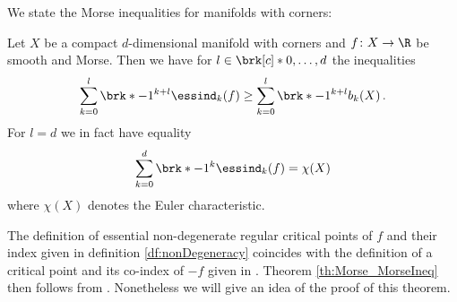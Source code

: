 We state the Morse inequalities for manifolds with corners:
\begin{theorem}
  \label{th:Morse_MorseIneq}
  Let $X$ be a compact $d$-dimensional manifold with corners and $f\colon X\to\R$ be smooth and Morse.
  Then we have for $l\in\brk[c]*{0,\dots,d}$ the inequalities
  \begin{align}
    \sum_{k=0}^l \brk*{-1}^{k+l}\essind_k(f)\geq \sum_{k=0}^l\brk*{-1}^{k+l}b_k(X)\,.
    \label{eq:MorseIneq_inequality}
  \end{align}
  For $l=d$ we in fact have equality
  \begin{align}
    \sum_{k=0}^d \brk*{-1}^{k}\essind_k(f)= \chi(X)\label{eq:MorseIneq_equality}
  \end{align}
  where $\chi(X)$ denotes the Euler characteristic.
\end{theorem}
  The definition of essential non-degenerate regular critical points of $f$ and their index given in definition \ref{df:nonDegeneracy} coincides with 
  the definition of a critical point and its co-index of $-f$ given in \cite{Agrach1991}.
  Theorem \ref{th:Morse_MorseIneq} then follows from \cite[Theorem 2.4]{Agrach1991}.
  Nonetheless we will give an idea of the proof of this theorem.

